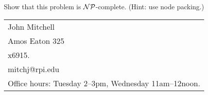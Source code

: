 \documentclass[12pt]{article}
\newcommand{\NP}{\begin{math}{\cal N}{\cal P}\end{math}}
\begin{document}
\begin{enumerate}
\begin{displaymath}
\end{displaymath}
Show that this problem is \NP-complete.
(Hint: use node packing.)

\end{enumerate}

\vfill

\begin{tabular}{@{\hspace{.5in}}l}
   John Mitchell  \\
   Amos Eaton 325  \\
   x6915.  \\
   mitchj@rpi.edu  \\
   Office hours:
   Tuesday 2--3pm, Wednesday 11am--12noon.
\end{tabular}
\end{document}
